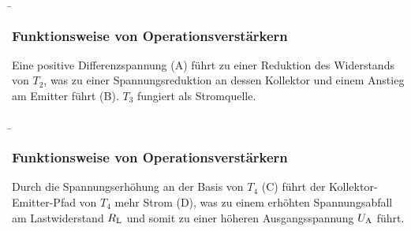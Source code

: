 \begin{frame}
    \b{ %
        \frametitle{Funktionsweise von Operationsverstärkern}
        \begin{figure}[ht]
                \centering
        \end{figure}   
        Eine positive Differenzspannung (A) führt zu einer Reduktion des Widerstands von $T_2$, was zu einer Spannungsreduktion an dessen Kollektor und einem Anstieg am Emitter führt (B). $T_3$ fungiert als Stromquelle.}

\end{frame}

\begin{frame}\b{
    \frametitle{Funktionsweise von Operationsverstärkern}
    \begin{figure}[ht]
            \centering
    \end{figure}   
Durch die Spannungserhöhung an der Basis von $T_4$ (C) führt der Kollektor-\linebreak Emitter-Pfad von $T_4$ mehr Strom (D), was zu einem erhöhten Spannungsabfall am Lastwiderstand $R_{\textnormal{L}}$ und somit zu einer höheren Ausgangsspannung $U_{\textnormal{A}}$ führt.}
\end{frame}

